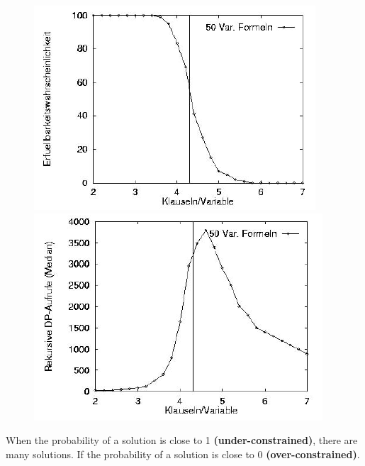 \documentclass{article}
\begin{document}
\begin{figure}[bht!]
\includegraphics[scale=0.7]{37.png}
\includegraphics[scale=0.7]{38.png}
\end{figure}
When the probability of a solution is close to 1 \textbf{(under-constrained)}, there are many solutions. If the probability of a solution is close to 0 \textbf{(over-constrained)}.\\
\end{document}
